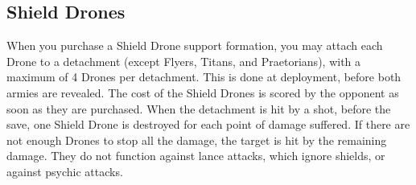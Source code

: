 \subsection{Shield Drones}

When you purchase a Shield Drone support formation, you may attach each Drone to a detachment (except Flyers, Titans, and Praetorians), with a maximum of 4 Drones per detachment. This is done at deployment, before both armies are revealed. The cost of the Shield Drones is scored by the opponent as soon as they are purchased. When the detachment is hit by a shot, before the save, one Shield Drone is destroyed for each point of damage suffered. If there are not enough Drones to stop all the damage, the target is hit by the remaining damage. They do not function against lance attacks, which ignore shields, or against psychic attacks.
